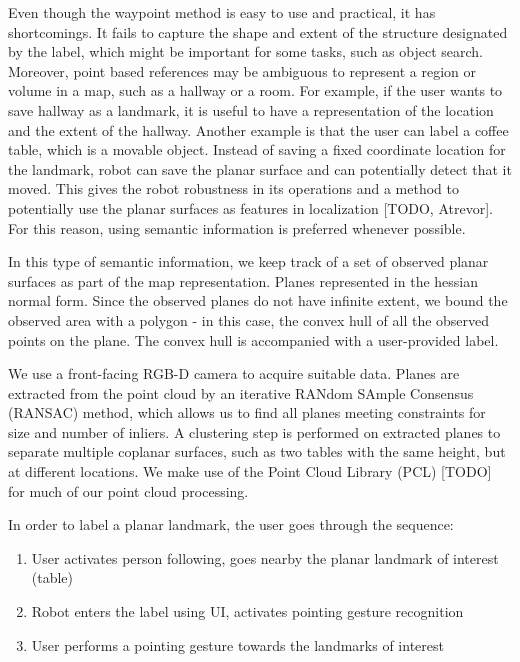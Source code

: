 \documentclass[12pt]{gatech-thesis}
\begin{document}
Even though the waypoint method is easy to use and practical, it has shortcomings. It fails to capture the shape and extent of the structure designated by the label, which might be important for some tasks, such as object search. Moreover, point based references may be ambiguous to represent a region or volume in a map, such as a hallway or a room. For example, if the user wants to save hallway as a
landmark, it is useful to have a representation of the location
and the extent of the hallway. Another example is that the
user can label a coffee table, which is a movable object.
Instead of saving a fixed coordinate location for the landmark,
robot can save the planar surface and can potentially
detect that it moved. This gives the robot robustness in its operations and a method to potentially use the planar surfaces as features in localization [TODO, Atrevor]. For this reason, using semantic information is preferred whenever possible.

In this type of semantic information, we keep track of a set of observed planar surfaces as part of the map representation. Planes represented in the hessian normal form. Since the observed planes do not have infinite extent, we bound the observed area with a polygon - in this case, the convex hull of all the observed points on the plane. The convex hull is accompanied with a user-provided label. 

We use a front-facing RGB-D camera to acquire suitable data. Planes are extracted from the point cloud by an iterative RANdom SAmple Consensus (RANSAC) method, which allows us to find all planes meeting constraints for size and number of inliers. A clustering step is performed on extracted planes to separate multiple coplanar surfaces, such as two tables with
the same height, but at different locations. We make use of the Point Cloud Library (PCL) [TODO] for much of our point cloud processing.

In order to label a planar landmark, the user goes through the sequence:

\begin{enumerate}
\item User activates person following, goes nearby the planar landmark of interest (table)
\item Robot enters the label using UI, activates pointing gesture recognition
\item User performs a pointing gesture towards the landmarks of interest
\end{enumerate}
\end{document}
